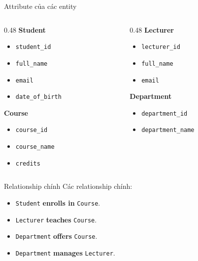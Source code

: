 \documentclass[aspectratio=169,11pt]{beamer}
\newcommand{\keyword}[1]{\textcolor{accent}{\textbf{#1}}}
\newcommand{\kw}[1]{\keyword{#1}}
\newcommand{\smallitem}{\setlength{\itemsep}{2pt}\setlength{\parskip}{0pt}}
\begin{document}
\begin{frame}{Attribute của các entity}
\scriptsize
\begin{columns}[T]
\begin{column}{0.48\textwidth}
\textbf{Student}
\begin{itemize}
\smallitem
  \item \texttt{student\_id}
  \item \texttt{full\_name}
  \item \texttt{email}
  \item \texttt{date\_of\_birth}
\end{itemize}

\textbf{Course}
\begin{itemize}
\smallitem
  \item \texttt{course\_id}
  \item \texttt{course\_name}
  \item \texttt{credits}
\end{itemize}
\end{column}
\begin{column}{0.48\textwidth}
\textbf{Lecturer}
\begin{itemize}
\smallitem
  \item \texttt{lecturer\_id}
  \item \texttt{full\_name}
  \item \texttt{email}
\end{itemize}

\textbf{Department}
\begin{itemize}
\smallitem
  \item \texttt{department\_id}
  \item \texttt{department\_name}
\end{itemize}
\end{column}
\end{columns}
\end{frame}

\begin{frame}{Relationship chính}
\small
Các relationship chính:
\begin{itemize}
\smallitem
  \item \texttt{Student} \kw{enrolls in} \texttt{Course}.
  \item \texttt{Lecturer} \kw{teaches} \texttt{Course}.
  \item \texttt{Department} \kw{offers} \texttt{Course}.
  \item \texttt{Department} \kw{manages} \texttt{Lecturer}.
\end{itemize}
\end{frame}
\end{document}
